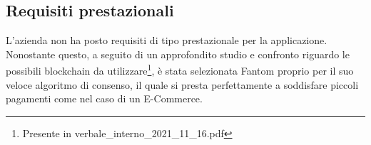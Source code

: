 \subsection{Requisiti prestazionali} \label{subsection:requisiti_prestazionali}

L'azienda non ha posto requisiti di tipo prestazionale per la applicazione.
Nonostante questo, a seguito di un approfondito studio e confronto riguardo le possibili blockchain da utilizzare\footnote{Presente in verbale\_interno\_2021\_11\_16.pdf}, 
è stata selezionata Fantom proprio per il suo veloce algoritmo di consenso, il quale si presta perfettamente a soddisfare piccoli pagamenti 
come nel caso di un E-Commerce.

\clearpage
